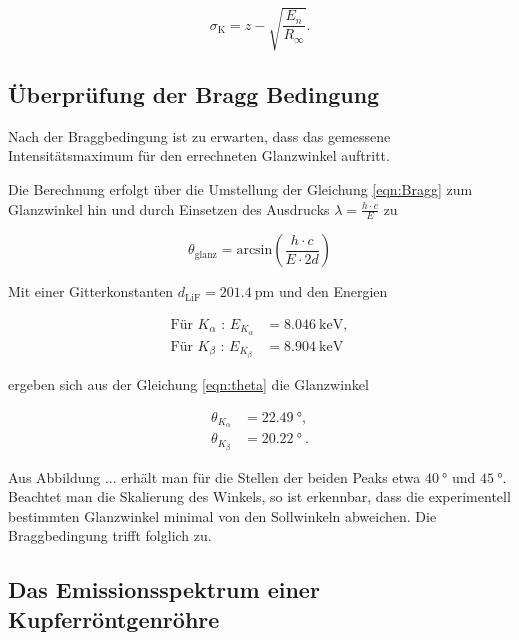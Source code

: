   \begin{equation}
    \sigma_\text{K} = z - \sqrt{\frac{E_n}{R_{\infty}}}.
  \end{equation}








\subsection{Überprüfung der Bragg Bedingung}

Nach der Braggbedingung ist zu erwarten, dass das gemessene Intensitätsmaximum
für den errechneten Glanzwinkel auftritt. 

Die Berechnung erfolgt über die Umstellung der Gleichung \eqref{eqn:Bragg} zum Glanzwinkel
hin und durch Einsetzen des Ausdrucks $\lambda = \frac{h \cdot c}{E}$ zu 

\begin{equation}
  \theta_\text{glanz} = \text{arcsin}\left(\frac{h \cdot c}{E \cdot 2d}\right)
  \label{eqn:theta}
\end{equation}

Mit einer Gitterkonstanten $d_\text{LiF} = \SI{201.4}{\pico\meter}$ und den Energien

\begin{align*}
   \text{Für } K_\alpha \text{ : } E_{K_\alpha} &= \SI{8.046}{\kilo\eV}, \\
   \text{Für } K_\beta \text{ : } E_{K_\beta} &= \SI{8.904}{\kilo\eV}
\end{align*}

ergeben sich aus der Gleichung \eqref{eqn:theta} die Glanzwinkel

\begin{align*}
  \theta_{K_\alpha} &= \SI{22.49}{\degree}, \\
  \theta_{K_\beta} &= \SI{20.22}{\degree} \: .
\end{align*}

Aus Abbildung ... erhält man für die Stellen der beiden Peaks etwa $\SI{40}{\degree}$
und $\SI{45}{\degree}$. Beachtet man die Skalierung des Winkels, so ist
erkennbar, dass die experimentell bestimmten Glanzwinkel minimal von den Sollwinkeln
abweichen. Die Braggbedingung trifft folglich zu.

\subsection{Das Emissionsspektrum einer Kupferröntgenröhre}








